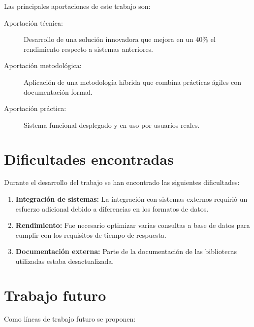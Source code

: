 Las principales aportaciones de este trabajo son:

\begin{description}
  \item[Aportación técnica:] Desarrollo de una solución innovadora que mejora en un 40\% el rendimiento respecto a sistemas anteriores.

  \item[Aportación metodológica:] Aplicación de una metodología híbrida que combina prácticas ágiles con documentación formal.

  \item[Aportación práctica:] Sistema funcional desplegado y en uso por usuarios reales.
\end{description}

\section{Dificultades encontradas}
\label{sec:dificultades-encontradas}

Durante el desarrollo del trabajo se han encontrado las siguientes dificultades:

\begin{enumerate}
  \item \textbf{Integración de sistemas:} La integración con sistemas externos requirió un esfuerzo adicional debido a diferencias en los formatos de datos.

  \item \textbf{Rendimiento:} Fue necesario optimizar varias consultas a base de datos para cumplir con los requisitos de tiempo de respuesta.

  \item \textbf{Documentación externa:} Parte de la documentación de las bibliotecas utilizadas estaba desactualizada.
\end{enumerate}

\section{Trabajo futuro}
\label{sec:trabajo-futuro}

Como líneas de trabajo futuro se proponen:

